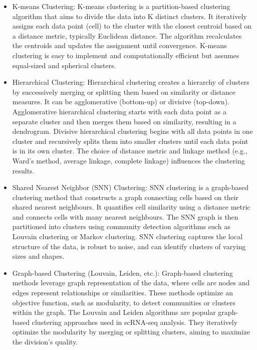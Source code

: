 \documentclass[aps,prb,twocolumn,superscriptaddress,floatfix,longbibliography]{revtex4-2}
\newcounter{para}
\begin{document}
\begin{itemize}
\item K-means Clustering:
K-means clustering is a partition-based clustering algorithm that aims to divide the data into K distinct clusters. It iteratively assigns each data point (cell) to the cluster with the closest centroid based on a distance metric, typically Euclidean distance. The algorithm recalculates the centroids and updates the assignment until convergence. K-means clustering is easy to implement and computationally efficient but assumes equal-sized and spherical clusters.

\item Hierarchical Clustering:
Hierarchical clustering creates a hierarchy of clusters by successively merging or splitting them based on similarity or distance measures. It can be agglomerative (bottom-up) or divisive (top-down). Agglomerative hierarchical clustering starts with each data point as a separate cluster and then merges them based on similarity, resulting in a dendrogram. Divisive hierarchical clustering begins with all data points in one cluster and recursively splits them into smaller clusters until each data point is in its own cluster. The choice of distance metric and linkage method (e.g., Ward's method, average linkage, complete linkage) influences the clustering results.

\item Shared Nearest Neighbor (SNN) Clustering:
SNN clustering is a graph-based clustering method that constructs a graph connecting cells based on their shared nearest neighbours. It quantifies cell similarity using a distance metric and connects cells with many nearest neighbours. The SNN graph is then partitioned into clusters using community detection algorithms such as Louvain clustering or Markov clustering. SNN clustering captures the local structure of the data, is robust to noise, and can identify clusters of varying sizes and shapes.

\item Graph-based Clustering (Louvain, Leiden, etc.):
Graph-based clustering methods leverage graph representation of the data, where cells are nodes and edges represent relationships or similarities. These methods optimize an objective function, such as modularity, to detect communities or clusters within the graph. The Louvain and Leiden algorithms are popular graph-based clustering approaches used in scRNA-seq analysis. They iteratively optimize the modularity by merging or splitting clusters, aiming to maximize the division's quality.
\end{itemize}
\end{document}
